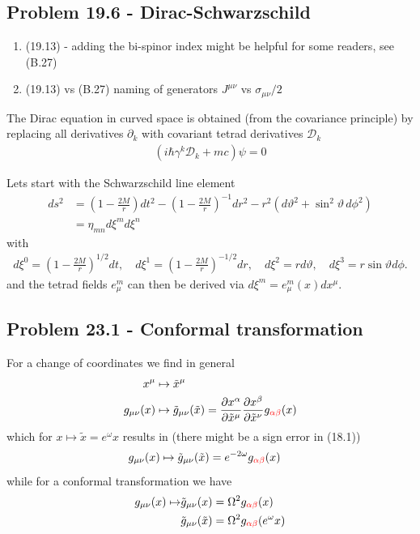 \documentclass[10pt,a4paper]{book}
\theoremstyle{definition}
\begin{document}
\subsection{Problem 19.6 - Dirac-Schwarzschild}
\begin{enumerate}
    \item (19.13) - adding the bi-spinor index might be helpful for some readers, see (B.27)
    \item (19.13) vs (B.27) naming of generators $J^{\mu\nu}$ vs $\sigma_{\mu\nu}/2$
\end{enumerate}
The Dirac equation in curved space is obtained (from the covariance principle) by replacing all derivatives $\partial_k$ with covariant tetrad derivatives $\mathscr{D}_k$ 
\begin{align}
    (i\hbar\gamma^k\mathscr{D}_k+mc)\psi=0
\end{align}




Lets start with the Schwarzschild line element
\begin{align}
    ds^2&=\left(1-\frac{2M}{r}\right)dt^2-\left(1-\frac{2M}{r}\right)^{-1}dr^2-r^2(d\vartheta^2+\sin^2\vartheta\,d\phi^2)\\
    &=\eta_{mn}d\xi^md\xi^n
\end{align}
with
\begin{align}
    d\xi^0=\left(1-\frac{2M}{r}\right)^{1/2}dt,\quad d\xi^1=\left(1-\frac{2M}{r}\right)^{-1/2}dr,\quad d\xi^2=rd\vartheta,\quad d\xi^3=r\sin\vartheta d\phi.
\end{align}
and the tetrad fields $e^m_\mu$ can then be derived via $d\xi^m=e^m_\mu(x) dx^\mu$.



\subsection{Problem 23.1 - Conformal transformation}
For a change of coordinates we find in general
\begin{align}
    x^\mu&\mapsto\tilde{x}^\mu\\
    g_{\mu\nu}(x)&\mapsto\tilde{g}_{\mu\nu}(\tilde{x})=\frac{\partial x^\alpha}{\partial \tilde x^\mu}\frac{\partial x^\beta}{\partial \tilde x^\nu}g_{\textcolor{red}{\alpha\beta}}(x)
\end{align}
which for $x\mapsto\tilde{x}=e^{\omega}x$ results in (there might be a sign error in (18.1))
\begin{align}
    g_{\mu\nu}(x)&\mapsto\tilde{g}_{\mu\nu}(\tilde{x})=e^{-2\omega}g_{\textcolor{red}{\alpha\beta}}(x)
\end{align}
while for a conformal transformation we have 
\begin{align}
    g_{\mu\nu}(x)\mapsto &\tilde{g}_{\mu\nu}(x)=\Omega^2g_{\textcolor{red}{\alpha\beta}}(x)\\
    &\tilde{g}_{\mu\nu}(\tilde{x})=\Omega^2g_{\textcolor{red}{\alpha\beta}}(e^{\omega}x)
\end{align}
\end{document}
